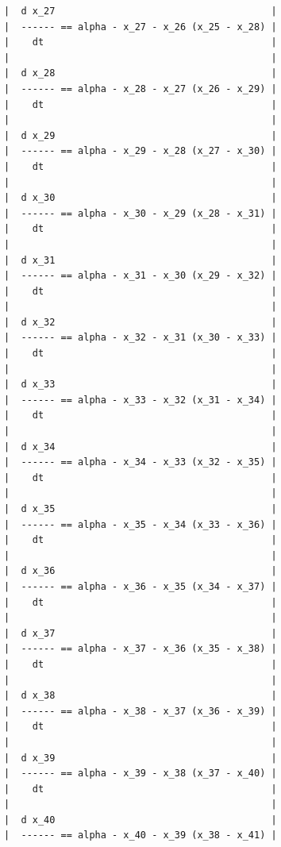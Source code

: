 {\begin{verbatim}
|  d x_27                                      |
|  ------ == alpha - x_27 - x_26 (x_25 - x_28) |
|    dt                                        |
|                                              |
|  d x_28                                      |
|  ------ == alpha - x_28 - x_27 (x_26 - x_29) |
|    dt                                        |
|                                              |
|  d x_29                                      |
|  ------ == alpha - x_29 - x_28 (x_27 - x_30) |
|    dt                                        |
|                                              |
|  d x_30                                      |
|  ------ == alpha - x_30 - x_29 (x_28 - x_31) |
|    dt                                        |
|                                              |
|  d x_31                                      |
|  ------ == alpha - x_31 - x_30 (x_29 - x_32) |
|    dt                                        |
|                                              |
|  d x_32                                      |
|  ------ == alpha - x_32 - x_31 (x_30 - x_33) |
|    dt                                        |
|                                              |
|  d x_33                                      |
|  ------ == alpha - x_33 - x_32 (x_31 - x_34) |
|    dt                                        |
|                                              |
|  d x_34                                      |
|  ------ == alpha - x_34 - x_33 (x_32 - x_35) |
|    dt                                        |
|                                              |
|  d x_35                                      |
|  ------ == alpha - x_35 - x_34 (x_33 - x_36) |
|    dt                                        |
|                                              |
|  d x_36                                      |
|  ------ == alpha - x_36 - x_35 (x_34 - x_37) |
|    dt                                        |
|                                              |
|  d x_37                                      |
|  ------ == alpha - x_37 - x_36 (x_35 - x_38) |
|    dt                                        |
|                                              |
|  d x_38                                      |
|  ------ == alpha - x_38 - x_37 (x_36 - x_39) |
|    dt                                        |
|                                              |
|  d x_39                                      |
|  ------ == alpha - x_39 - x_38 (x_37 - x_40) |
|    dt                                        |
|                                              |
|  d x_40                                      |
|  ------ == alpha - x_40 - x_39 (x_38 - x_41) |

\end{verbatim}}
